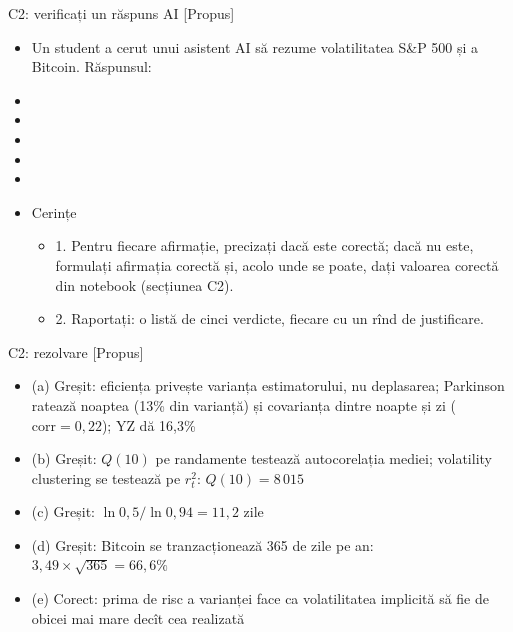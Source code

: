 \begin{frame}{C2: verificați un răspuns AI [Propus]}
\itemsize{\scriptsize}
\begin{itemize}
    \item Un student a cerut unui asistent AI să rezume volatilitatea S\&P 500 și a Bitcoin. Răspunsul:
    \item {}
    \item {}
    \item {}
    \item {}
    \item {}
    \item Cerințe
    \begin{itemize}
        \item 1. Pentru fiecare afirmație, precizați dacă este corectă; dacă nu este, formulați afirmația corectă și, acolo unde se poate, dați valoarea corectă din notebook (secțiunea C2).
        \item 2. Raportați: o listă de cinci verdicte, fiecare cu un rînd de justificare.
    \end{itemize}
\end{itemize}
\end{frame}

\ifsolutions
\begin{frame}{C2: rezolvare [Propus]}
\itemsize{\footnotesize}
\begin{itemize}
    \item (a) Greșit: eficiența privește varianța estimatorului, nu deplasarea; Parkinson ratează noaptea (13\% din varianță) și covarianța dintre noapte și zi ($\mathrm{corr} = 0{,}22$); YZ dă 16{,}3\%
    \item (b) Greșit: $Q(10)$ pe randamente testează autocorelația mediei; volatility clustering se testează pe $r_t^2$: $Q(10) = 8\,015$
    \item (c) Greșit: $\ln 0{,}5/\ln 0{,}94 = 11{,}2$ zile
    \item (d) Greșit: Bitcoin se tranzacționează 365 de zile pe an: $3{,}49 \times \sqrt{365} = 66{,}6\%$
    \item (e) Corect: prima de risc a varianței face ca volatilitatea implicită să fie de obicei mai mare decît cea realizată
\end{itemize}
\end{frame}
\fi


